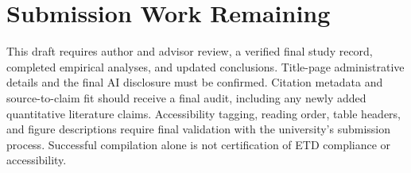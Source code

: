 \section{Submission Work Remaining}
This draft requires author and advisor review, a verified final study record, completed empirical analyses, and updated conclusions. Title-page administrative details and the final AI disclosure must be confirmed. Citation metadata and source-to-claim fit should receive a final audit, including any newly added quantitative literature claims. Accessibility tagging, reading order, table headers, and figure descriptions require final validation with the university's submission process. Successful compilation alone is not certification of ETD compliance or accessibility.
